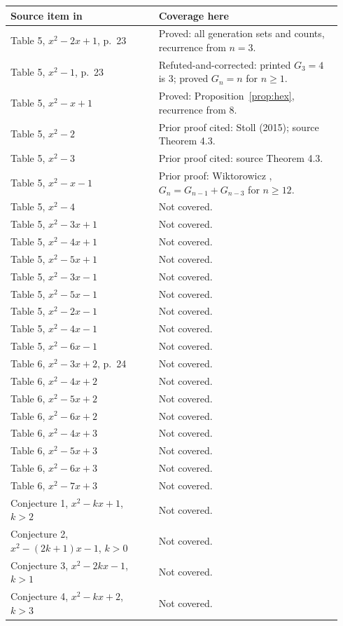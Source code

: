 \documentclass[11pt]{article}
\begin{document}
\begin{longtable}{@{}p{0.42\linewidth}p{0.52\linewidth}@{}}
\toprule
Source item in \cite{bkm} & Coverage here\\
\midrule
\endhead
Table 5, $x^2-2x+1$, p.~23 & Proved: all generation sets and counts,
recurrence from $n=3$.\\
Table 5, $x^2-1$, p.~23 & Refuted-and-corrected: printed $G_3=4$
is $3$; proved $G_n=n$ for $n\geq1$.\\
Table 5, $x^2-x+1$ & Proved: Proposition~\ref{prop:hex}, recurrence from $8$.\\
Table 5, $x^2-2$ & Prior proof cited: Stoll (2015); source Theorem 4.3.\\
Table 5, $x^2-3$ & Prior proof cited: source Theorem 4.3.\\
Table 5, $x^2-x-1$ & Prior proof: Wiktorowicz \cite{wiktorowicz},
$G_n=G_{n-1}+G_{n-3}$ for $n\geq12$.\\
Table 5, $x^2-4$ & Not covered.\\
Table 5, $x^2-3x+1$ & Not covered.\\
Table 5, $x^2-4x+1$ & Not covered.\\
Table 5, $x^2-5x+1$ & Not covered.\\
Table 5, $x^2-3x-1$ & Not covered.\\
Table 5, $x^2-5x-1$ & Not covered.\\
Table 5, $x^2-2x-1$ & Not covered.\\
Table 5, $x^2-4x-1$ & Not covered.\\
Table 5, $x^2-6x-1$ & Not covered.\\
Table 6, $x^2-3x+2$, p.~24 & Not covered.\\
Table 6, $x^2-4x+2$ & Not covered.\\
Table 6, $x^2-5x+2$ & Not covered.\\
Table 6, $x^2-6x+2$ & Not covered.\\
Table 6, $x^2-4x+3$ & Not covered.\\
Table 6, $x^2-5x+3$ & Not covered.\\
Table 6, $x^2-6x+3$ & Not covered.\\
Table 6, $x^2-7x+3$ & Not covered.\\
Conjecture 1, $x^2-kx+1$, $k>2$ & Not covered.\\
Conjecture 2, $x^2-(2k+1)x-1$, $k>0$ & Not covered.\\
Conjecture 3, $x^2-2kx-1$, $k>1$ & Not covered.\\
Conjecture 4, $x^2-kx+2$, $k>3$ & Not covered.\\

\end{longtable}
\end{document}
